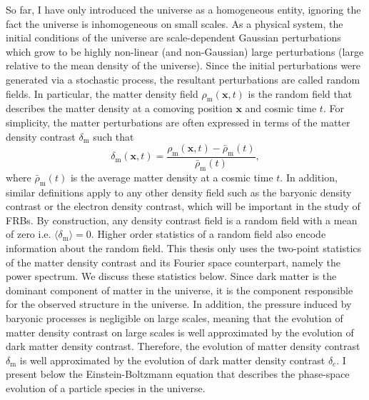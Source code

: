 So far, I have only introduced the universe as a homogeneous entity, ignoring the fact the universe is inhomogeneous on small scales. As a physical system, the initial conditions of the universe are scale-dependent Gaussian perturbations which grow to be highly non-linear (and non-Gaussian) large perturbations (large relative to the mean density of the universe). Since the initial perturbations were generated via a stochastic process, the resultant perturbations are called random fields. In particular, the matter density field $\rho_{\mathrm{m}} (\mathbf{x}, t)$ is the random field that describes the matter density at a comoving position $\mathbf{x}$ and cosmic time $t$. For simplicity, the matter perturbations are often expressed in terms of the matter density contrast $\delta_{\mathrm{m}}$ such that
\begin{equation}
    \delta_{\mathrm{m}} (\mathbf{x}, t) = \frac{\rho_{\mathrm{m}} (\mathbf{x}, t) - \bar{\rho}_{\mathrm{m}}(t)}{\bar{\rho}_{\mathrm{m}}(t)},
\end{equation}
where $\bar{\rho}_{\mathrm{m}}(t)$ is the average matter density at a cosmic time $t$. In addition, similar definitions apply to any other density field such as the baryonic density contrast or the electron density contrast, which will be important in the study of FRBs. By construction, any density contrast field is a random field with a mean of zero i.e. $\langle \delta_{\mathrm{m}} \rangle = 0$. Higher order statistics of a random field also encode information about the random field. This thesis only uses the two-point statistics of the matter density contrast and its Fourier space counterpart, namely the power spectrum. We discuss these statistics below. Since dark matter is the dominant component of matter in the universe, it is the component responsible for the observed structure in the universe. In addition, the pressure induced by baryonic processes is negligible on large scales, meaning that the evolution of matter density contrast on large scales is well approximated by the evolution of dark matter density contrast. Therefore, the evolution of matter density contrast $\delta_{\mathrm{m}}$ is well approximated by the evolution of dark matter density contrast $\delta_c$. I present below the Einstein-Boltzmann equation that describes the phase-space evolution of a particle species in the universe.



